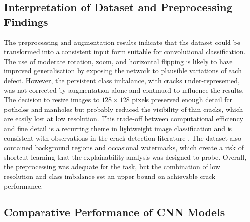 \documentclass[preprint,12pt]{elsarticle}
\begin{document}
\subsection{Interpretation of Dataset and Preprocessing Findings}

The preprocessing and augmentation results indicate that the dataset could be transformed into a consistent input form suitable for convolutional classification.
The use of moderate rotation, zoom, and horizontal flipping is likely to have improved generalisation by exposing the network to plausible variations of each defect.
However, the persistent class imbalance, with cracks under-represented, was not corrected by augmentation alone and continued to influence the results.
The decision to resize images to $128 \times 128$ pixels preserved enough detail for potholes and manholes but probably reduced the visibility of thin cracks, which are easily lost at low resolution.
This trade-off between computational efficiency and fine detail is a recurring theme in lightweight image classification and is consistent with observations in the crack-detection literature \cite{zhu2024lightweight, tabernik2023automated}.
The dataset also contained background regions and occasional watermarks, which create a risk of shortcut learning that the explainability analysis was designed to probe.
Overall, the preprocessing was adequate for the task, but the combination of low resolution and class imbalance set an upper bound on achievable crack performance.

\subsection{Comparative Performance of CNN Models}
\end{document}
